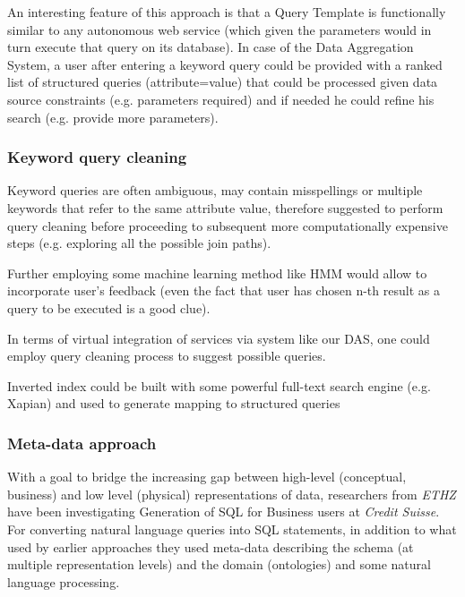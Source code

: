 \documentclass[a4paper,11pt,draft]{article}
\begin{document}
An interesting feature of this approach is that a Query Template is functionally similar to any autonomous web service (which given the parameters would in turn execute that query on its database).  In case of the Data Aggregation System, a user after entering a keyword query could be provided with a ranked list of structured queries (attribute=value) that could be processed given data source constraints (e.g. parameters required) and if needed he could refine his search (e.g. provide more parameters).


\subsubsection*{Keyword query cleaning}
Keyword queries are often ambiguous, may contain misspellings or multiple keywords that refer to the same attribute value,  therefore \cite{kw_cleaning} suggested to perform query cleaning before proceeding to subsequent more computationally expensive steps (e.g. exploring all the possible join paths).

Further employing some machine learning method like HMM\cite{kw_cleaning_hmm} would allow to incorporate user's feedback (even the fact that user has chosen n-th result as a query to be executed is a good clue).

{\color{red} In terms of virtual integration of services via system like our DAS, one could employ query cleaning process to suggest possible queries.

Inverted index could be built with some powerful full-text search engine (e.g. Xapian) and used to generate mapping to structured queries}



\subsubsection*{Meta-data approach}

With a goal to bridge the increasing gap between high-level (conceptual, business) and low level (physical) representations of data, researchers from \textit{ETHZ} have been investigating Generation of SQL for Business users at \textit{Credit Suisse}.  For converting natural language queries 
 into SQL statements, in addition to what used by earlier approaches they used meta-data describing the schema (at multiple representation levels) and the domain (ontologies) and some natural language processing.
\end{document}
